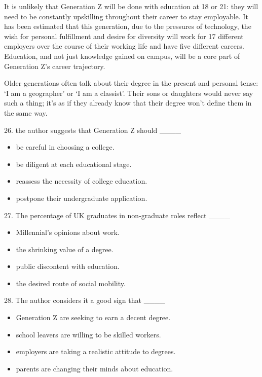 \documentclass[UTF8,11pt]{ctexart}
\begin{document}
It is unlikely that Generation Z will be done with education at 18 or 21: they will need to be constantly upskilling throughout their career to stay employable. It has been estimated that this generation, due to the pressures of technology, the wish for personal fulfillment and desire for diversity will work for 17 different employers over the course of their working life and have five different careers. Education, and not just knowledge gained on campus, will be a core part of Generation Z’s career trajectory.


Older generations often talk about their degree in the present and personal tense: ‘I am a geographer’ or ‘I am a classist’. Their sons or daughters would never say such a thing; it’s as if they already know that their degree won’t define them in the same way.


26. the author suggests that Generation Z should \_\_\_\_


\begin{itemize}[leftmargin=2em,itemsep=.2em,topsep=.4em]\item[A.] be careful in choosing a college.
\item[B.] be diligent at each educational stage.
\item[C.] reassess the necessity of college education.
\item[D.] postpone their undergraduate application.
\end{itemize}

27. The percentage of UK graduates in non-graduate roles reflect \_\_\_\_


\begin{itemize}[leftmargin=2em,itemsep=.2em,topsep=.4em]\item[A.] Millennial’s opinions about work.
\item[B.] the shrinking value of a degree.
\item[C.] public discontent with education.
\item[D.] the desired route of social mobility.
\end{itemize}

28. The author considers it a good sign that \_\_\_\_


\begin{itemize}[leftmargin=2em,itemsep=.2em,topsep=.4em]\item[A.] Generation Z are seeking to earn a decent degree.
\item[B.] school leavers are willing to be skilled workers.
\item[C.] employers are taking a realistic attitude to degrees.
\item[D.] parents are changing their minds about education.
\end{itemize}
\end{document}
